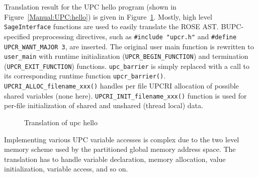 Translation result for the UPC hello program (shown in
Figure~\ref{Manual:UPC:hello}) is given in Figure~\ref{Manual:UPC:hello-trans}. 
Mostly, high level \lstinline{SageInterface} functions are used to
easily translate the ROSE AST. 
BUPC-specified preprocessing directives, such as \lstinline{#include "upcr.h"} 
and \lstinline{#define UPCR_WANT_MAJOR 3}, are inserted.
The original user main function is rewritten to \lstinline{user_main} with
runtime initialization (\lstinline{UPCR_BEGIN_FUNCTION}) and termination 
(\lstinline{UPCR_EXIT_FUNCTION}) functions. 
\lstinline{upc_barrier} is simply replaced with a call to its corresponding
runtime function \lstinline{upcr_barrier()}.
\lstinline{UPCRI_ALLOC_filename_xxx()} handles per file UPCRI allocation of
possible shared variables (none here).  
\lstinline{UPCRI_INIT_filename_xxx()} function is used for per-file initialization of
shared and unshared (thread local) data.


\begin{figure}[!h]
{\indent
  {\mySmallFontSize
    \begin{latexonly}
    
    \end{latexonly}
    \begin{htmlonly}
    
    \end{htmlonly}
  }
}
\caption{Translation of upc hello}
\label{Manual:UPC:hello-trans}
\end{figure}

\clearpage
Implementing various UPC variable accesses is complex due to the two level
memory scheme used by the partitioned global memory address space.
The translation has to handle variable declaration, memory allocation,
value initialization, variable access, and so on. 

